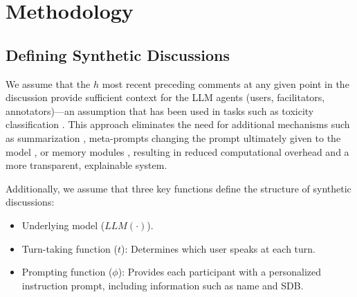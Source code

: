 %

\section{Methodology}
\label{sec:methodology}

\subsection{Defining Synthetic Discussions}
\label{ssec:methodology:discussions}



We assume that the $h$ most recent preceding comments at any given point in the discussion provide sufficient context for the \ac{LLM} agents (users, facilitators, annotators)—an assumption that has been used in tasks such as toxicity classification \cite{pavlopoulos_2020_toxicity}. This approach eliminates the need for additional mechanisms such as summarization \cite{balog_2024}, meta-prompts changing the prompt ultimately given to the model \cite{yu_2024_fincon}, or memory modules \cite{Vezhnevets2023GenerativeAM}, resulting in reduced computational overhead and a more transparent, explainable system.

Additionally, we assume that three key functions define the structure of synthetic discussions:
\begin{itemize}[nosep, noitemsep]
    \item Underlying model ($\textit{LLM}(\cdot)$).
    \item Turn-taking function ($t$): Determines which user speaks at each turn.
    \item Prompting function ($\phi$): Provides each participant with a personalized instruction prompt, including information such as name and \ac{SDB}.
\end{itemize}


